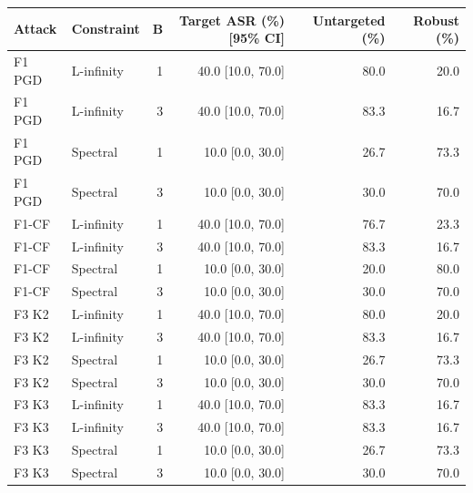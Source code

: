 \begin{tabular}{llrrrr}
\toprule
Attack & Constraint & B & Target ASR (\%) [95\% CI] & Untargeted (\%) & Robust (\%) \\
\midrule
F1 PGD & L-infinity & 1 & 40.0 [10.0, 70.0] & 80.0 & 20.0 \\
F1 PGD & L-infinity & 3 & 40.0 [10.0, 70.0] & 83.3 & 16.7 \\
F1 PGD & Spectral & 1 & 10.0 [0.0, 30.0] & 26.7 & 73.3 \\
F1 PGD & Spectral & 3 & 10.0 [0.0, 30.0] & 30.0 & 70.0 \\
F1-CF & L-infinity & 1 & 40.0 [10.0, 70.0] & 76.7 & 23.3 \\
F1-CF & L-infinity & 3 & 40.0 [10.0, 70.0] & 83.3 & 16.7 \\
F1-CF & Spectral & 1 & 10.0 [0.0, 30.0] & 20.0 & 80.0 \\
F1-CF & Spectral & 3 & 10.0 [0.0, 30.0] & 30.0 & 70.0 \\
F3 K2 & L-infinity & 1 & 40.0 [10.0, 70.0] & 80.0 & 20.0 \\
F3 K2 & L-infinity & 3 & 40.0 [10.0, 70.0] & 83.3 & 16.7 \\
F3 K2 & Spectral & 1 & 10.0 [0.0, 30.0] & 26.7 & 73.3 \\
F3 K2 & Spectral & 3 & 10.0 [0.0, 30.0] & 30.0 & 70.0 \\
F3 K3 & L-infinity & 1 & 40.0 [10.0, 70.0] & 83.3 & 16.7 \\
F3 K3 & L-infinity & 3 & 40.0 [10.0, 70.0] & 83.3 & 16.7 \\
F3 K3 & Spectral & 1 & 10.0 [0.0, 30.0] & 26.7 & 73.3 \\
F3 K3 & Spectral & 3 & 10.0 [0.0, 30.0] & 30.0 & 70.0 \\
\bottomrule
\end{tabular}
